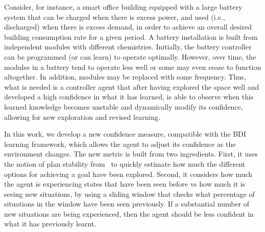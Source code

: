 Consider, for instance, a smart office building equipped with a large battery system that can be charged when there is excess power, and used (i.e., discharged) when there is excess demand, in order to achieve an overall desired building consumption rate for a given period. A battery installation is built from independent modules with different chemistries. Initially, the battery controller can be programmed (or can learn) to operate optimally. However, over time, the modules in a battery tend to operate less well or some may even cease to function altogether. In addition, modules may be replaced with some frequency.  
Thus, what is needed is a controller agent that after having explored the space well and developed a high confidence in what it has learned, is able to observe when this learned knowledge becomes unstable and dynamically modify its confidence, allowing for new exploration and revised learning.




In this work, we develop a new confidence measure, compatible with the BDI learning framework, which allows the agent to adjust its confidence as the environment changes.
The new metric is built from two ingredients.
First, it uses the notion of plan stability from~\cite{airiau09:enhancing,singh10:learning} to quickly estimate how much the different options for achieving a goal have been explored.
Second, it considers how much the agent is experiencing states that have been seen before vs how much it is seeing new situations, by using a sliding window that checks what percentage of situations in the window have been seen previously. If a substantial number of new situations are being experienced, then the agent should be less confident in what it has previously learnt. 

